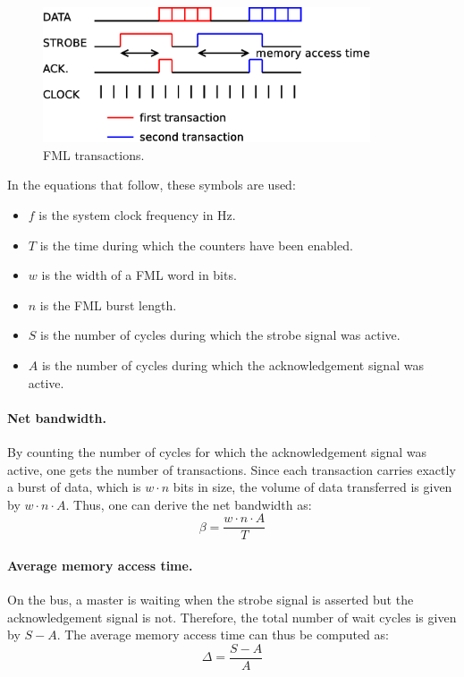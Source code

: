 \documentclass[a4paper,11pt]{kthesis}
\begin{document}
\begin{figure}
\centering
\includegraphics[height=40mm]{fmltransactions.eps}
\caption{FML transactions.} \label{fig:fmltransactions}
\end{figure}

In the equations that follow, these symbols are used:
\begin{itemize}
\item $f$ is the system clock frequency in Hz.
\item $T$ is the time during which the counters have been enabled.
\item $w$ is the width of a FML word in bits.
\item $n$ is the FML burst length.
\item $S$ is the number of cycles during which the strobe signal was active.
\item $A$ is the number of cycles during which the acknowledgement signal was active.
\end{itemize}

\paragraph{Net bandwidth.} By counting the number of cycles for which the acknowledgement signal was active, one gets the number of transactions. Since each transaction carries exactly a burst of data, which is $w \cdot n$ bits in size, the volume of data transferred is given by $w \cdot n \cdot A $. Thus, one can derive the net bandwidth as:
\begin{equation}
\beta = \frac{w \cdot n \cdot A}{T}
\end{equation}

\paragraph{Average memory access time.} On the bus, a master is waiting when the strobe signal is asserted but the acknowledgement signal is not. Therefore, the total number of wait cycles is given by $S-A$. The average memory access time can thus be computed as:
\begin{equation}
\Delta = \frac{S-A}{A}
\end{equation}
\end{document}
